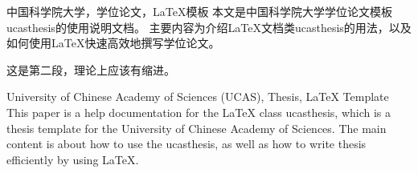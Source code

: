 \begin{chineseabstract}{中国科学院大学，学位论文，\LaTeX{}模板}
本文是中国科学院大学学位论文模板ucasthesis的使用说明文档。
    主要内容为介绍\LaTeX{}文档类ucasthesis的用法，以及如何使用\LaTeX{}快速高效地撰写学位论文。

    这是第二段，理论上应该有缩进。
\end{chineseabstract}
\begin{englishabstract}{University of Chinese Academy of Sciences (UCAS), Thesis, \LaTeX{} Template}
    This paper is a help documentation for the \LaTeX{} class ucasthesis, which is  a thesis template for the University of Chinese Academy of Sciences. The main content is about how to use the ucasthesis, as well as how to write thesis efficiently by using \LaTeX{}.
\end{englishabstract}